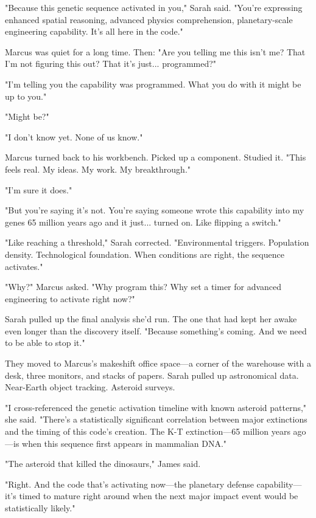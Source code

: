 "Because this genetic sequence activated in you," Sarah said. "You're expressing enhanced spatial reasoning, advanced physics comprehension, planetary-scale engineering capability. It's all here in the code."

Marcus was quiet for a long time. Then: "Are you telling me this isn't me? That I'm not figuring this out? That it's just... programmed?"

"I'm telling you the capability was programmed. What you do with it might be up to you."

"Might be?"

"I don't know yet. None of us know."

Marcus turned back to his workbench. Picked up a component. Studied it. "This feels real. My ideas. My work. My breakthrough."

"I'm sure it does."

"But you're saying it's not. You're saying someone wrote this capability into my genes 65 million years ago and it just... turned on. Like flipping a switch."

"Like reaching a threshold," Sarah corrected. "Environmental triggers. Population density. Technological foundation. When conditions are right, the sequence activates."

"Why?" Marcus asked. "Why program this? Why set a timer for advanced engineering to activate right now?"

Sarah pulled up the final analysis she'd run. The one that had kept her awake even longer than the discovery itself. "Because something's coming. And we need to be able to stop it."

\scenebreak

They moved to Marcus's makeshift office space—a corner of the warehouse with a desk, three monitors, and stacks of papers. Sarah pulled up astronomical data. Near-Earth object tracking. Asteroid surveys.

"I cross-referenced the genetic activation timeline with known asteroid patterns," she said. "There's a statistically significant correlation between major extinctions and the timing of this code's creation. The K-T extinction—65 million years ago—is when this sequence first appears in mammalian DNA."

"The asteroid that killed the dinosaurs," James said.

"Right. And the code that's activating now—the planetary defense capability—it's timed to mature right around when the next major impact event would be statistically likely."

